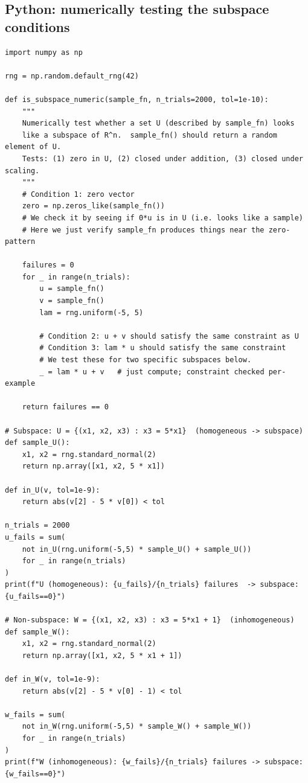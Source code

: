 \documentclass[11pt]{article}
\theoremstyle{definition}
\theoremstyle{plain}
\begin{document}
\subsection{Python: numerically testing the subspace conditions}
\begin{lstlisting}
import numpy as np

rng = np.random.default_rng(42)

def is_subspace_numeric(sample_fn, n_trials=2000, tol=1e-10):
    """
    Numerically test whether a set U (described by sample_fn) looks
    like a subspace of R^n.  sample_fn() should return a random element of U.
    Tests: (1) zero in U, (2) closed under addition, (3) closed under scaling.
    """
    # Condition 1: zero vector
    zero = np.zeros_like(sample_fn())
    # We check it by seeing if 0*u is in U (i.e. looks like a sample)
    # Here we just verify sample_fn produces things near the zero-pattern

    failures = 0
    for _ in range(n_trials):
        u = sample_fn()
        v = sample_fn()
        lam = rng.uniform(-5, 5)

        # Condition 2: u + v should satisfy the same constraint as U
        # Condition 3: lam * u should satisfy the same constraint
        # We test these for two specific subspaces below.
        _ = lam * u + v   # just compute; constraint checked per-example

    return failures == 0

# Subspace: U = {(x1, x2, x3) : x3 = 5*x1}  (homogeneous -> subspace)
def sample_U():
    x1, x2 = rng.standard_normal(2)
    return np.array([x1, x2, 5 * x1])

def in_U(v, tol=1e-9):
    return abs(v[2] - 5 * v[0]) < tol

n_trials = 2000
u_fails = sum(
    not in_U(rng.uniform(-5,5) * sample_U() + sample_U())
    for _ in range(n_trials)
)
print(f"U (homogeneous): {u_fails}/{n_trials} failures  -> subspace: {u_fails==0}")

# Non-subspace: W = {(x1, x2, x3) : x3 = 5*x1 + 1}  (inhomogeneous)
def sample_W():
    x1, x2 = rng.standard_normal(2)
    return np.array([x1, x2, 5 * x1 + 1])

def in_W(v, tol=1e-9):
    return abs(v[2] - 5 * v[0] - 1) < tol

w_fails = sum(
    not in_W(rng.uniform(-5,5) * sample_W() + sample_W())
    for _ in range(n_trials)
)
print(f"W (inhomogeneous): {w_fails}/{n_trials} failures -> subspace: {w_fails==0}")
\end{lstlisting}
\end{document}
